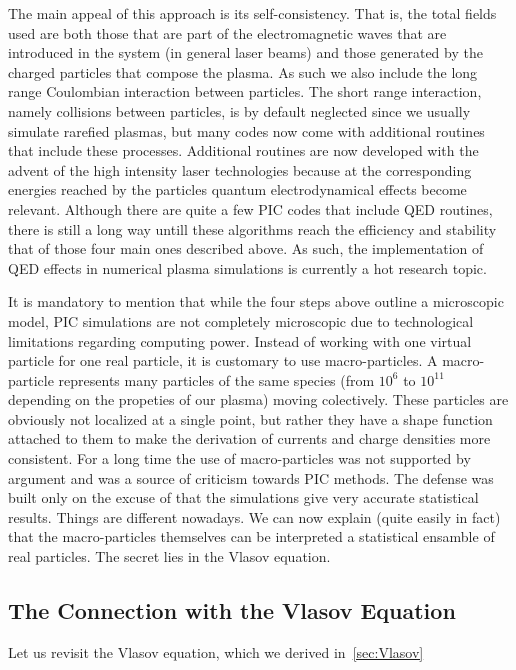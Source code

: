 \documentclass[12pt, class=report, crop=false]{standalone}
\begin{document}
The main appeal of this approach is its self-consistency. That is, the total fields used are both those that are part of the electromagnetic waves that are introduced in the system (in general laser beams) and those generated by the charged particles that compose the plasma. As such we also include the long range Coulombian interaction between particles. The short range interaction, namely collisions between particles, is by default neglected since we usually simulate rarefied plasmas, but many codes now come with additional routines that include these processes. Additional routines are now developed with the advent of the high intensity laser technologies because at the corresponding energies reached by the particles quantum electrodynamical effects become relevant. Although there are quite a few PIC codes that include QED routines, there is still a long way untill these algorithms reach the efficiency and stability that of those four main ones described above. As such, the implementation of QED effects in numerical plasma simulations is currently a hot research topic.

It is mandatory to mention that while the four steps above outline a microscopic model, PIC simulations are not completely microscopic due to technological limitations regarding computing power. Instead of working with one virtual particle for one real particle, it is customary to use macro-particles. A macro-particle represents many particles of the same species (from \(10^6\) to \(10^11\) depending on the propeties of our plasma) moving colectively. These particles are obviously not localized at a single point, but rather they have a shape function attached to them to make the derivation of currents and charge densities more consistent. For a long time the use of macro-particles was not supported by argument and was a source of criticism towards PIC methods. The defense was built only on the excuse of that the simulations give very accurate statistical results. Things are different nowadays. We can now explain (quite easily in fact) that the macro-particles themselves can be interpreted a statistical ensamble of real particles. The secret lies in the Vlasov equation.

\subsection{The Connection with the Vlasov Equation}

Let us revisit the Vlasov equation, which we derived in~\cref{sec:Vlasov}
\end{document}
